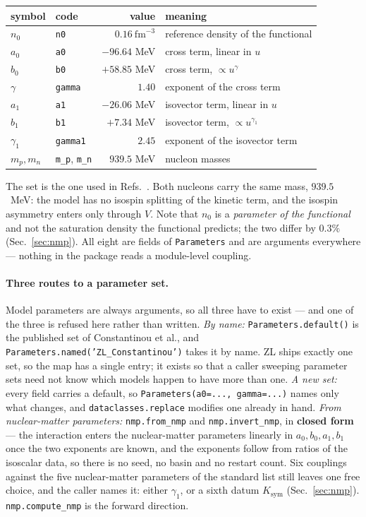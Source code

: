 \documentclass[aps,prc,onecolumn,superscriptaddress,nofootinbib,10pt]{revtex4-2}
\begin{document}
\begin{center}
\begin{tabular}{llrl}
\toprule
symbol & code & value & meaning \\
\midrule
$n_0$      & \texttt{n0}     & $0.16\ \mathrm{fm}^{-3}$ & reference density of the functional \\
$a_0$      & \texttt{a0}     & $-96.64$ MeV & cross term, linear in $u$ \\
$b_0$      & \texttt{b0}     & $+58.85$ MeV & cross term, $\propto u^{\gamma}$ \\
$\gamma$   & \texttt{gamma}  & $1.40$       & exponent of the cross term \\
$a_1$      & \texttt{a1}     & $-26.06$ MeV & isovector term, linear in $u$ \\
$b_1$      & \texttt{b1}     & $+7.34$ MeV  & isovector term, $\propto u^{\gamma_1}$ \\
$\gamma_1$ & \texttt{gamma1} & $2.45$       & exponent of the isovector term \\
$m_p, m_n$ & \texttt{m\_p}, \texttt{m\_n} & $939.5$ MeV & nucleon masses \\
\bottomrule
\end{tabular}
\end{center}
%
The set is the one used in
Refs.~\cite{Constantinou2021,Constantinou2023,Constantinou2025}. Both nucleons
carry the same mass, $939.5$~MeV: the model has no isospin splitting of the
kinetic term, and the isospin asymmetry enters only through $V$. Note that
$n_0$ is a \emph{parameter of the functional} and not the saturation density
the functional predicts; the two differ by $0.3\%$ (Sec.~\ref{sec:nmp}). All
eight are fields of \texttt{Parameters} and are arguments everywhere --- nothing
in the package reads a module-level coupling.

\paragraph{Three routes to a parameter set.} Model parameters are always
arguments, so all three have to exist --- and one of the three is refused here
rather than written. \emph{By name:} \texttt{Parameters.default()} is the
published set of Constantinou et al., and
\texttt{Parameters.named('ZL\_Constantinou')} takes it by name. ZL ships
exactly one set, so the map has a single entry; it exists so that a caller
sweeping parameter sets need not know which models happen to have more than
one. \emph{A new set:} every field carries a default, so
\texttt{Parameters(a0=..., gamma=...)} names only what changes, and
\texttt{dataclasses.replace} modifies one already in hand. \emph{From
nuclear-matter parameters:} \texttt{nmp.from\_nmp} and
\texttt{nmp.invert\_nmp}, in \textbf{closed form} --- the interaction enters
the nuclear-matter parameters linearly in $a_0, b_0, a_1, b_1$ once the two
exponents are known, and the exponents follow from ratios of the isoscalar
data, so there is no seed, no basin and no restart count. Six couplings against
the five nuclear-matter parameters of the standard list still leaves one free
choice, and the caller names it: either $\gamma_1$, or a sixth datum
$K_{\mathrm{sym}}$ (Sec.~\ref{sec:nmp}). \texttt{nmp.compute\_nmp} is the
forward direction.
\end{document}
